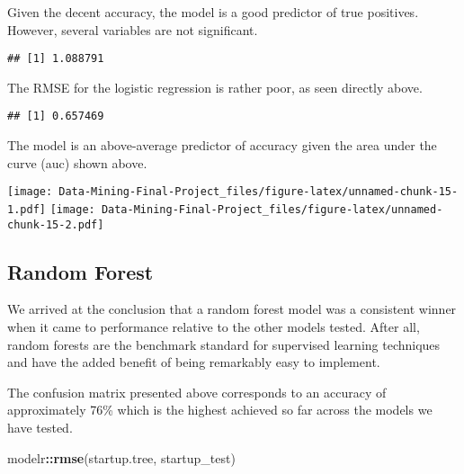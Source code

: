 \documentclass[
]{article}
\newenvironment{Shaded}{\begin{snugshade}}{\end{snugshade}}
\newcommand{\CommentTok}[1]{\textcolor[rgb]{0.56,0.35,0.01}{\textit{#1}}}
\newcommand{\KeywordTok}[1]{\textcolor[rgb]{0.13,0.29,0.53}{\textbf{#1}}}
\newcommand{\NormalTok}[1]{#1}
\newcommand{\OperatorTok}[1]{\textcolor[rgb]{0.81,0.36,0.00}{\textbf{#1}}}
\newcommand{\StringTok}[1]{\textcolor[rgb]{0.31,0.60,0.02}{#1}}
\begin{document}
Given the decent accuracy, the model is a good predictor of true
positives. However, several variables are not significant.

\begin{verbatim}
## [1] 1.088791
\end{verbatim}

The RMSE for the logistic regression is rather poor, as seen directly
above.

\begin{verbatim}
## [1] 0.657469
\end{verbatim}

The model is an above-average predictor of accuracy given the area under
the curve (auc) shown above.

\texttt{[image: Data-Mining-Final-Project\_files/figure-latex/unnamed-chunk-15-1.pdf]}
\texttt{[image: Data-Mining-Final-Project\_files/figure-latex/unnamed-chunk-15-2.pdf]}

\hypertarget{random-forest}{%
\subsection{Random Forest}\label{random-forest}}

We arrived at the conclusion that a random forest model was a consistent
winner when it came to performance relative to the other models tested.
After all, random forests are the benchmark standard for supervised
learning techniques and have the added benefit of being remarkably easy
to implement.

\begin{Shaded}
\end{Shaded}

The confusion matrix presented above corresponds to an accuracy of
approximately 76\% which is the highest achieved so far across the
models we have tested.

\begin{Shaded}
\begin{Highlighting}[]
\NormalTok{modelr}\OperatorTok{::}\KeywordTok{rmse}\NormalTok{(startup.tree, startup_test)}
\end{Highlighting}
\end{Shaded}
\end{document}
